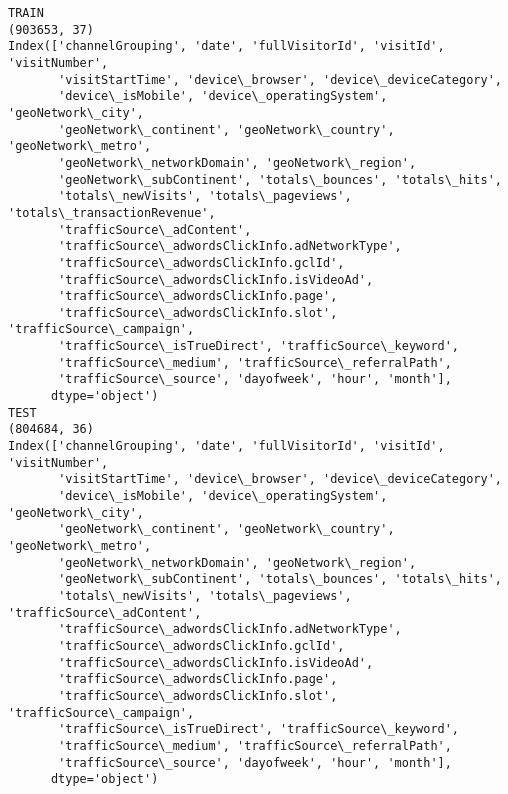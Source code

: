 \documentclass[11pt]{article}
\begin{document}
    \begin{Verbatim}[commandchars=\\\{\}]
TRAIN
(903653, 37)
Index(['channelGrouping', 'date', 'fullVisitorId', 'visitId', 'visitNumber',
       'visitStartTime', 'device\_browser', 'device\_deviceCategory',
       'device\_isMobile', 'device\_operatingSystem', 'geoNetwork\_city',
       'geoNetwork\_continent', 'geoNetwork\_country', 'geoNetwork\_metro',
       'geoNetwork\_networkDomain', 'geoNetwork\_region',
       'geoNetwork\_subContinent', 'totals\_bounces', 'totals\_hits',
       'totals\_newVisits', 'totals\_pageviews', 'totals\_transactionRevenue',
       'trafficSource\_adContent',
       'trafficSource\_adwordsClickInfo.adNetworkType',
       'trafficSource\_adwordsClickInfo.gclId',
       'trafficSource\_adwordsClickInfo.isVideoAd',
       'trafficSource\_adwordsClickInfo.page',
       'trafficSource\_adwordsClickInfo.slot', 'trafficSource\_campaign',
       'trafficSource\_isTrueDirect', 'trafficSource\_keyword',
       'trafficSource\_medium', 'trafficSource\_referralPath',
       'trafficSource\_source', 'dayofweek', 'hour', 'month'],
      dtype='object')
TEST
(804684, 36)
Index(['channelGrouping', 'date', 'fullVisitorId', 'visitId', 'visitNumber',
       'visitStartTime', 'device\_browser', 'device\_deviceCategory',
       'device\_isMobile', 'device\_operatingSystem', 'geoNetwork\_city',
       'geoNetwork\_continent', 'geoNetwork\_country', 'geoNetwork\_metro',
       'geoNetwork\_networkDomain', 'geoNetwork\_region',
       'geoNetwork\_subContinent', 'totals\_bounces', 'totals\_hits',
       'totals\_newVisits', 'totals\_pageviews', 'trafficSource\_adContent',
       'trafficSource\_adwordsClickInfo.adNetworkType',
       'trafficSource\_adwordsClickInfo.gclId',
       'trafficSource\_adwordsClickInfo.isVideoAd',
       'trafficSource\_adwordsClickInfo.page',
       'trafficSource\_adwordsClickInfo.slot', 'trafficSource\_campaign',
       'trafficSource\_isTrueDirect', 'trafficSource\_keyword',
       'trafficSource\_medium', 'trafficSource\_referralPath',
       'trafficSource\_source', 'dayofweek', 'hour', 'month'],
      dtype='object')

    \end{Verbatim}
\end{document}
